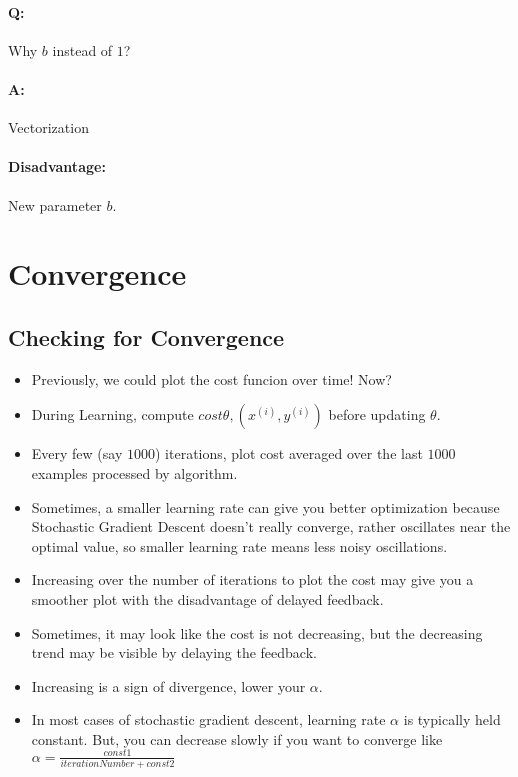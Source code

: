 \paragraph{Q:} Why $b$ instead of $1$?
\paragraph{A:} Vectorization

\paragraph{Disadvantage:} New parameter $b$.

\section{Convergence}
\subsection{Checking for Convergence}
\begin{itemize}
	\item Previously, we could plot the cost funcion over time! Now?
	\item During Learning, compute ${cost}{\theta, (x^{(i)}, y^{(i)})}$ before
	      updating $\theta$.
	\item Every few (say $1000$) iterations, plot cost averaged over the last $1000$ examples
	      processed by algorithm.
	\item Sometimes, a smaller learning rate can give you better optimization because
	      Stochastic Gradient Descent doesn't really converge, rather oscillates near
	      the optimal value, so smaller learning rate means less noisy oscillations.
	\item Increasing over the number of iterations to plot the cost may give you a smoother
	      plot with the disadvantage of delayed feedback.
	\item Sometimes, it may look like the cost is not decreasing, but the decreasing trend
	      may be visible by delaying the feedback.
	\item Increasing is a sign of divergence, lower your $\alpha$.
	\item In most cases of stochastic gradient descent, learning rate $\alpha$ is
	      typically held constant. But, you can decrease slowly if you want to
	      converge like $\alpha = \frac{const1}{iterationNumber + const2}$
\end{itemize}

